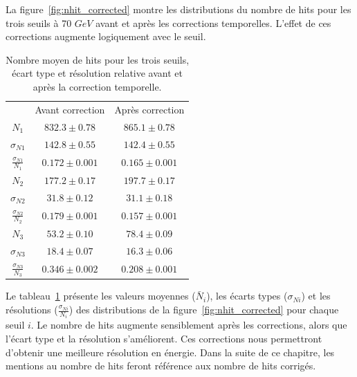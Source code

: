 La figure~\ref{fig:nhit_corrected} montre les distributions du nombre de hits pour les trois seuils à 70 $GeV$ avant et après les corrections temporelles. L'effet de ces corrections augmente logiquement avec le seuil. 
\begin{table}[!ht]
  \begin{center}
    \begin{tabular}{c|c|c}
      \rowcolor{black!20!white}$ $ & Avant correction & Après correction \\
      \rowcolor{black!5!white}\hline
      \rowcolor{black!5!white}$N_1$ & $832.3 \pm 0.78$ & $865.1 \pm 0.78$\\
      \rowcolor{black!5!white}$\sigma_{N1}$ & $142.8 \pm 0.55$ & $142.4 \pm 0.55$\\
      \rowcolor{black!5!white}$\frac{\sigma_{N1}}{N_1}$ & $0.172 \pm 0.001$& $0.165 \pm 0.001$\\
      \rowcolor{black!5!white}\hline
      \rowcolor{black!5!white}$N_2$ & $177.2 \pm 0.17$ & $197.7 \pm 0.17$\\
      \rowcolor{black!5!white}$\sigma_{N2}$ & $31.8 \pm 0.12$ & $31.1 \pm 0.18$\\
      \rowcolor{black!5!white}$\frac{\sigma_{N2}}{N_2}$ & $0.179 \pm 0.001$& $0.157 \pm 0.001$\\
      \rowcolor{black!5!white}\hline
      \rowcolor{black!5!white}$N_3$ & $53.2 \pm 0.10$ & $78.4 \pm 0.09$\\
      \rowcolor{black!5!white}$\sigma_{N3}$ & $18.4 \pm 0.07$ & $16.3 \pm 0.06$\\
      \rowcolor{black!5!white}$\frac{\sigma_{N3}}{N_3}$ & $0.346 \pm 0.002$& $0.208 \pm 0.001$\\
    \end{tabular}
  \end{center}  
  \caption{Nombre moyen de hits pour les trois seuils, écart type et résolution relative avant et après la correction temporelle.}
  \label{tab.n_comp}
\end{table}
Le tableau~\ref{tab.n_comp} présente les valeurs moyennes ($\bar N_i$), les écarts types ($\sigma_{Ni}$) et les résolutions ($\frac{\sigma_{Ni}}{N_i}$) des distributions de la figure~\ref{fig:nhit_corrected} pour chaque seuil $i$. Le nombre de hits augmente sensiblement après les corrections, alors que l'écart type et la résolution s'améliorent. 
Ces corrections nous permettront d'obtenir une meilleure résolution en énergie. Dans la suite de ce chapitre, les mentions au nombre de hits feront référence aux nombre de hits corrigés.

